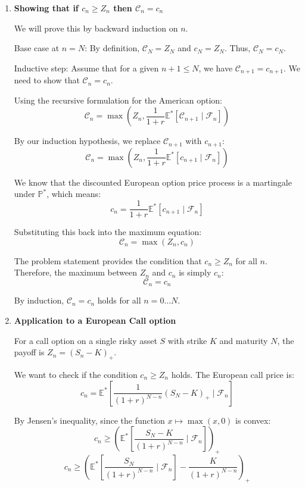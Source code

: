 \begin{enumerate}
      \item \textbf{Showing that if $c_n \ge Z_n$ then $\mathcal{C}_n = c_n$}

            We will prove this by backward induction on $n$.

            Base case at $n = N$:
            By definition, $\mathcal{C}_N = Z_N$ and $c_N = Z_N$. Thus, $\mathcal{C}_N = c_N$.

            Inductive step:
            Assume that for a given $n+1 \le N$, we have $\mathcal{C}_{n+1} = c_{n+1}$.
            We need to show that $\mathcal{C}_n = c_n$.

            Using the recursive formulation for the American option:
            \[ \mathcal{C}_n = \max\left(Z_n, \frac{1}{1+r} \mathbb{E}^*\left[\mathcal{C}_{n+1} \mid \mathcal{F}_n\right]\right) \]

            By our induction hypothesis, we replace $\mathcal{C}_{n+1}$ with $c_{n+1}$:
            \[ \mathcal{C}_n = \max\left(Z_n, \frac{1}{1+r} \mathbb{E}^*\left[c_{n+1} \mid \mathcal{F}_n\right]\right) \]

            We know that the discounted European option price process is a martingale under $\mathbb{P}^*$, which means:
            \[ c_n = \frac{1}{1+r} \mathbb{E}^*\left[c_{n+1} \mid \mathcal{F}_n\right] \]

            Substituting this back into the maximum equation:
            \[ \mathcal{C}_n = \max(Z_n, c_n) \]

            The problem statement provides the condition that $c_n \ge Z_n$ for all $n$. Therefore, the maximum between $Z_n$ and $c_n$ is simply $c_n$:
            \[ \mathcal{C}_n = c_n \]

            By induction, $\mathcal{C}_n = c_n$ holds for all $n = 0 \dots N$.

      \item \textbf{Application to a European Call option}

            For a call option on a single risky asset $S$ with strike $K$ and maturity $N$, the payoff is $Z_n = (S_n - K)_+$.

            We want to check if the condition $c_n \ge Z_n$ holds. The European call price is:
            \[ c_n = \mathbb{E}^*\left[\frac{1}{(1+r)^{N-n}} (S_N - K)_+ \mid \mathcal{F}_n\right] \]

            By Jensen's inequality, since the function $x \mapsto \max(x, 0)$ is convex:
            \[ c_n \ge \left( \mathbb{E}^*\left[\frac{S_N - K}{(1+r)^{N-n}} \mid \mathcal{F}_n\right] \right)_+ \]
            \[ c_n \ge \left( \mathbb{E}^*\left[\frac{S_N}{(1+r)^{N-n}} \mid \mathcal{F}_n\right] - \frac{K}{(1+r)^{N-n}} \right)_+ \]


\end{enumerate}
